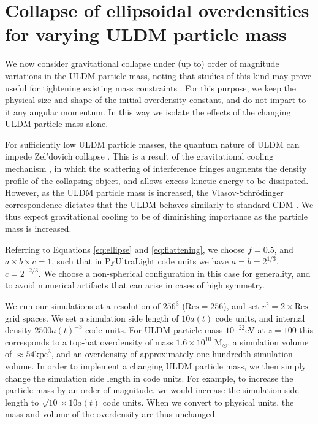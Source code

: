 \documentclass[a4paper,11pt]{article}
\begin{document}
\section{Collapse of ellipsoidal overdensities for varying ULDM particle mass}\label{sec:ULDM_mass}

We now consider gravitational collapse under (up to) order of magnitude variations in the ULDM particle mass, noting that studies of this kind may prove useful for tightening existing mass constraints \cite{Marsh:2018zyw, Armengaud:2017nkf, Irsic:2017yje}. For this purpose, we keep the physical size and shape of the initial overdensity constant, and do not impart to it any angular momentum. In this way we isolate the effects of the changing ULDM particle mass alone. 

For sufficiently low ULDM particle masses, the quantum nature of ULDM can impede Zel'dovich collapse \cite{Zeldovich:1969sb}. This is a result of the gravitational cooling mechanism \cite{Bak:2018pda, Guzman:2006yc}, in which the scattering of interference fringes augments the density profile of the collapsing object, and allows excess kinetic energy to be dissipated. However, as the ULDM particle mass is increased, the Vlasov-Schr{\"o}dinger correspondence dictates that the ULDM behaves similarly to standard CDM \cite{Mocz:2018ium}. We thus expect gravitational cooling to be of diminishing importance as the particle mass is increased. 

Referring to Equations \ref{eq:ellipse} and \ref{eq:flattening}, we choose $f=0.5$, and $a\times b\times c = 1$, such that in {\sc PyUltraLight} code units we have $a = b = 2^{1/3}$, $c = 2^{-2/3}$. We choose a non-spherical configuration in this case for generality, and to avoid numerical artifacts that can arise in cases of high symmetry.

We run our simulations at a resolution of $256^3$ ($\mathrm{Res} = 256$), and set $r^2 =  2 \times \mathrm{Res}$ grid spaces. We set a simulation side length of $10 a(t)$ code units, and internal density $2500 a(t)^{-3}$ code units. For ULDM particle mass $10^{-22}$eV at $z=100$ this corresponds to a top-hat overdensity of mass $1.6 \times 10^{10}$ M$_\odot$, a simulation volume of $\approx 54 \mathrm{kpc}^{3}$, and an overdensity of approximately one hundredth simulation volume. 
In order to implement a changing ULDM particle mass, we then simply change the simulation side length in code units. For example, to increase the particle mass by an order of magnitude, we would increase the simulation side length to $\sqrt{10} \times 10a(t)$ code units. When we convert to physical units, the mass and volume of the overdensity are thus unchanged. 
\end{document}

